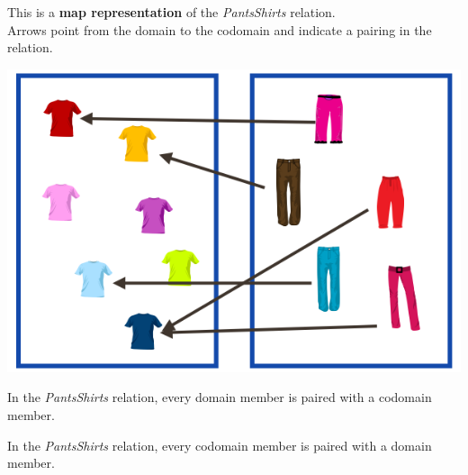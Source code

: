 \documentclass{ximera}
\author{Lee Wayand}
\begin{document}
\begin{exercise}

This is a \textbf{map representation} of the \textit{PantsShirts} relation. \\


Arrows point from the domain to the codomain and indicate a pairing in the relation.


\begin{image}
\includegraphics{../../pics/func_maps/f_16.png}
\end{image}




\begin{question} 
In the \textit{PantsShirts} relation, every domain member is paired with a codomain member.

\begin{multipleChoice}
\end{multipleChoice}
\end{question}







\begin{question} 
In the \textit{PantsShirts} relation, every codomain member is paired with a domain member.

\begin{multipleChoice}
\end{multipleChoice}
\end{question}








\end{exercise}
\end{document}
